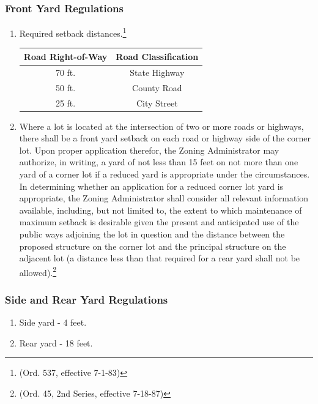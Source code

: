 \subsubsection{Front Yard Regulations}
\begin{enumerate}[{\indent}a)]
    \item Required setback distances.\footnote{(Ord. 537, effective 7-1-83)}        
        \begin{center}
        \begin{tabular}{|c|c|}
            \hline
            \textbf{Road Right-of-Way} & \textbf{Road Classification}\\
            \hline
            70 ft. & State Highway\\
            \hline
            50 ft. & County Road\\
            \hline
            25 ft. & City Street\\
            \hline
        \end{tabular}
        \end{center}
    \item Where a lot is located at the intersection of two or more roads or highways, there shall be a front yard setback on each road or highway side of the corner lot. Upon proper application therefor, the Zoning Administrator may authorize, in writing, a yard of not less than 15 feet on not more than one yard of a corner lot if a reduced yard is appropriate under the circumstances. In determining whether an application for a reduced corner lot yard is appropriate, the Zoning Administrator shall consider all relevant information available, including, but not limited to, the extent to which maintenance of maximum setback is desirable given the present and anticipated use of the public ways adjoining the lot in question and the distance between the proposed structure on the corner lot and the principal structure on the adjacent lot (a distance less than that required for a rear yard shall not be allowed).\footnote{(Ord. 45, 2nd Series, effective 7-18-87)}
\end{enumerate}
\subsubsection{Side and Rear Yard Regulations}
\begin{enumerate}[{\indent}a)]
    \item Side yard - 4 feet.
    \item Rear yard - 18 feet.
\end{enumerate}
